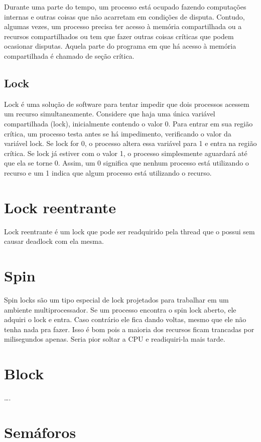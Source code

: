 Durante uma parte do tempo, um processo está ocupado fazendo computações internas e outras coisas que não acarretam
em condições de disputa. Contudo, algumas vezes, um processo precisa ter acesso à memória compartilhada ou a recursos compartilhados ou tem que fazer outras coisas críticas que podem ocasionar disputas. Aquela parte do programa
em que há acesso à memória compartilhada é chamado de seção crítica.


\subsection{Lock}

Lock é uma solução de software para tentar impedir que dois processos acessem um recurso 
simultaneamente. Considere que haja uma única variável compartilhada (lock), inicialmente 
contendo o valor 0. Para entrar em sua região crítica, um processo testa antes se há 
impedimento, verificando o valor da variável lock. Se lock for 0, o processo altera essa 
variável para 1 e entra na região crítica. Se lock já estiver com o valor 1, o processo 
simplesmente aguardará até que ela se torne 0. Assim, um 0 significa que nenhum processo 
está utilizando o recurso e um 1 indica que algum processo está utilizando o recurso. 


\section{Lock reentrante}

Lock reentrante é um lock que pode ser readquirido pela thread que o possui sem causar deadlock com ela mesma.

\section{Spin}

Spin locks são um tipo especial de lock projetados para trabalhar em um ambiente 
multiprocessador. Se um processo encontra o spin lock aberto, ele adquiri o lock e entra. 
Caso contrário ele fica dando voltas, mesmo que ele não tenha nada pra fazer. Isso é bom 
pois a maioria dos recursos ficam trancadas por milisegundos apenas. Seria pior soltar a 
CPU e readiquiri-la mais tarde.

\section{Block}
….


\section{Semáforos}

